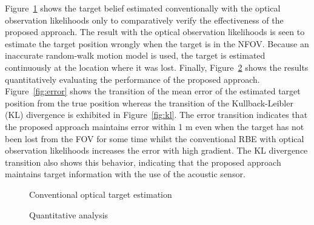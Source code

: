 Figure~\ref{fig:optical experiment} shows the target belief estimated conventionally with the optical observation likelihoods only to comparatively verify the effectiveness of the proposed approach.  The result with the optical observation likelihoods is seen to estimate the target position wrongly when the target is in the NFOV.  Because an inaccurate random-walk motion model is used, the target is estimated continuously at the location where it was lost.  Finally, Figure~\ref{fig:quantitative} shows the results quantitatively evaluating the performance of the proposed approach.  Figure~\ref{fig:error} shows the transition of the mean error of the estimated target position from the true position whereas the transition of the Kullback-Leibler (KL) divergence is exhibited in Figure~\ref{fig:kl}.  The error transition indicates that the proposed approach maintains error within 1 m even when the target has not been lost from the FOV for some time whilst the conventional RBE with optical observation likelihoods increases the error with high gradient.  The KL divergence transition also shows this behavior, indicating that the proposed approach maintains target information with the use of the acoustic sensor.  

\begin{figure}[ht]
	\centering
	\caption{Conventional optical target estimation}
	\label{fig:optical experiment}
\end{figure}

\begin{figure}[ht]
	\centering
	\caption{Quantitative analysis}
	\label{fig:quantitative}
\end{figure}

